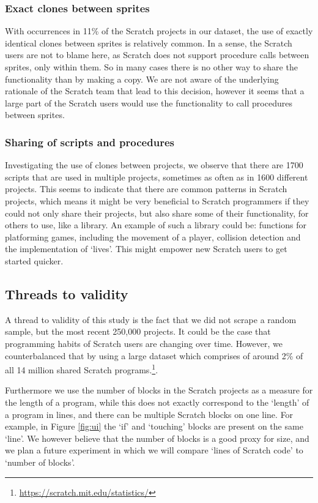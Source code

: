 \documentclass{sig-alternate}
\begin{document}
\subsubsection{Exact clones between sprites}
With occurrences in 11\% of the Scratch projects in our dataset, the use of exactly identical clones between sprites is relatively common. In a sense, the Scratch users are not to blame here, as Scratch does not support procedure calls between sprites, only within them. So in many cases there is no other way to share the functionality than by making a copy. We are not aware of the underlying rationale of the Scratch team that lead to this decision, however it seems that a large part of the Scratch users would use the functionality to call procedures between sprites.

\subsubsection{Sharing of scripts and procedures}
Investigating the use of clones between projects, we observe that there are 1700 scripts that are used in multiple projects, sometimes as often as in 1600 different projects. This seems to indicate that there are common patterns in Scratch projects, which means it might be very beneficial to Scratch programmers if they could not only share their projects, but also share some of their functionality, for others to use, like a library. An example of such a library could be: functions for platforming games, including the movement of a player, collision detection and the implementation of `lives'. This might empower new Scratch users to get started quicker.

\subsection{Threads to validity}
A thread to validity of this study is the fact that we did not scrape a random sample, but the most recent 250,000 projects. It could be the case that programming habits of Scratch users are changing over time. However, we counterbalanced that by using a large dataset which comprises of around 2\% of all 14 million shared Scratch programs.\footnote{\url{https://scratch.mit.edu/statistics/}}.

Furthermore we use the number of blocks in the Scratch projects as a measure for the length of a program, while this does not exactly correspond to the `length' of a program in lines, and there can be multiple Scratch blocks on one line. For example, in Figure \ref{fig:ui} the `if' and `touching' blocks are present on the same `line'. We however believe that the number of blocks is a good proxy for size, and we plan a future experiment in which we will compare `lines of Scratch code' to `number of blocks'.
\end{document}
